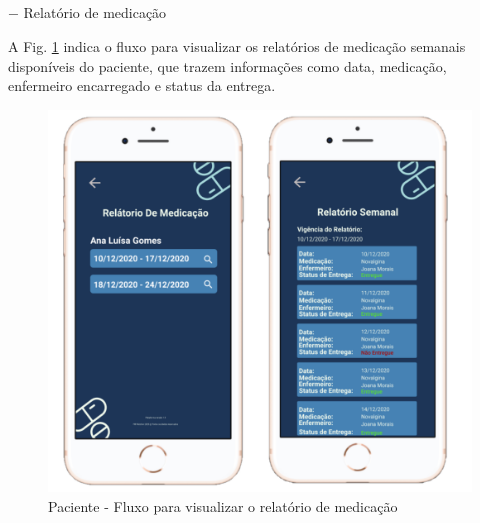 \subparagraph*{} $-$ Relatório de medicação

A Fig. \ref{fig:prototipo_paciente_relatorioDeMedicacao} indica o fluxo para visualizar os relatórios de medicação semanais disponíveis do paciente, que trazem informações como data, medicação, enfermeiro encarregado e status da entrega.

\begin{figure}[H]
    \centering
    \includegraphics[width=12cm]{figuras/software/Atual_prototipo/Paciente_relatorioDeMedicacao.png}
    \caption{Paciente - Fluxo para visualizar o relatório de medicação}
    \label{fig:prototipo_paciente_relatorioDeMedicacao}
\end{figure}

